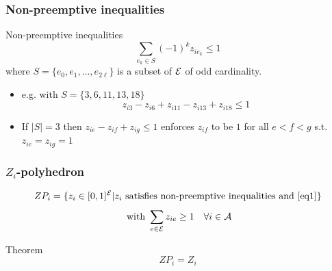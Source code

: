 \begin{frame}
\frametitle{Non-preemptive inequalities}
  \begin{block}{Non-preemptive inequalities}
    \[\sum_{e_k \in S} (-1)^kz _{ie_k} \leq 1\]
    where $S = \{e_0,e_1,\ldots,e_{2\ell}\}$ is a subset of 
    ${\cal E}$ of odd cardinality.
  \end{block}

    \vspace{0.6cm}
  \begin{itemize}
  \item<2-> e.g. with $S=\{3,6,11,13,18\}$
    \[ z_{i3} - z_{i6} + z_{i11}-z_{i13} +z_{i18} \le
      1 \]
\vfill
  \item<3-> If $|S|=3$ then $ z_{ie}-z_{if}+z_{ig} \le 1$ enforces
    $z_{if}$ to be $1$ for all $e<f<g$ s.t. $z_{ie}=z_{ig}=1$ 
  \end{itemize}

\end{frame}

\begin{frame}
  \frametitle{$Z_i$-polyhedron}
  \[ZP_i=\{ z_i \in [0,1]^{\cal E} | z_i\text{ satisfies
      non-preemptive inequalities and } \eqref{eq1}\}\] 
  \begin{equation}
    \text{ with }  \sum_{e \in \cal E} z_{ie} \ge 1 \quad \forall i \in \cal A  
    \label{eq1}  
  \end{equation}
  \pause
  \begin{block}{Theorem}
    \[ZP_i=Z_i\]
  \end{block}
  \vspace{0.5cm}
  \vspace{0.2cm}
\end{frame}


